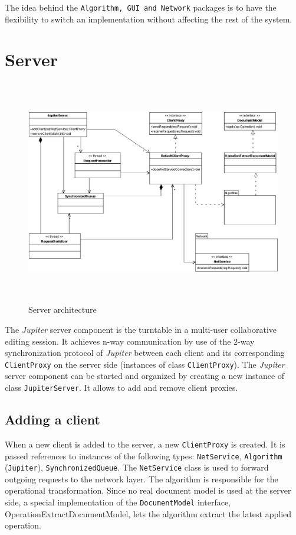 The idea behind the \texttt{Algorithm, GUI and Network} packages is to have the flexibility to switch an implementation without affecting the rest of the system.


\section{Server}
\begin{figure}[H]
\centering
\includegraphics[height=9.8cm,width=15.36cm]{../../images/algo-impl/server_diagram.eps}
\caption{Server architecture}
\label{Server architecture}
\end{figure}

The \emph{Jupiter} server component is the turntable in a multi-user collaborative editing session. It achieves n-way communication by use of the 2-way synchronization protocol of \emph{Jupiter} between each client and its corresponding \texttt{ClientProxy} on the server side (instances of class \texttt{ClientProxy}). The \emph{Jupiter} server component can be started and organized by creating a new instance of class \texttt{JupiterServer}. It allows to add and remove client proxies.

\subsection{Adding a client}
When a new client is added to the server, a new \texttt{ClientProxy} is created. It is passed references to instances of the following types: \texttt{NetService}, \texttt{Algorithm} (\texttt{Jupiter}), \texttt{SynchronizedQueue}. The \texttt{NetService} class is used to forward outgoing requests to the network layer. The algorithm is responsible for the operational transformation. Since no real document model is used at the server side, a special implementation of the \texttt{DocumentModel} interface, OperationExtractDocumentModel, lets the algorithm extract the latest applied operation.

